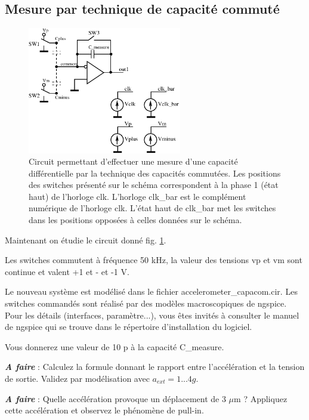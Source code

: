 \documentclass[12pt,A4,onecolumn,french]{article}
\begin{document}
\subsection{Mesure par technique de capacité commuté}

\begin{figure}
 \centering
 \includegraphics[width=0.6\textwidth]{measurement_capacom.eps}
 \caption{Circuit permettant d'effectuer une mesure d'une capacité différentielle par la technique des capacités commutées. Les positions des switches présenté sur le schéma correspondent à la phase 1 (état haut) de l'horloge clk. L'horloge clk\_bar est le complément numérique de l'horloge clk. L'état haut de clk\_bar met les switches dans les positions opposées à celles données sur le schéma. \label{fig:capacom}}
\end{figure}

Maintenant on étudie le circuit donné fig. \ref{fig:capacom}. 

Les switches commutent à fréquence 50 kHz, la valeur des tensions vp et
vm sont continue et valent +1 et - et -1 V. 

Le nouveau système est modélisé dans le fichier accelerometer\_capacom.cir. Les switches commandés sont réalisé par des modèles macroscopiques de ngspice. Pour les détails (interfaces, paramètre...), vous êtes invités à consulter le manuel de ngspice qui se trouve dans le répertoire d'installation du logiciel. 

Vous donnerez une valeur de 10 p à la capacité C\_measure. 

\emph{\bf A faire} : Calculez la formule donnant le rapport entre l'accélération et la tension de sortie.  Validez par modélisation avec $a_{ext}=1...4 g$. 

\emph{\bf A faire} : Quelle accélération provoque un déplacement de 3 $\mu$m ? Appliquez cette accélération et observez le phénomène de pull-in.  
\end{document}
